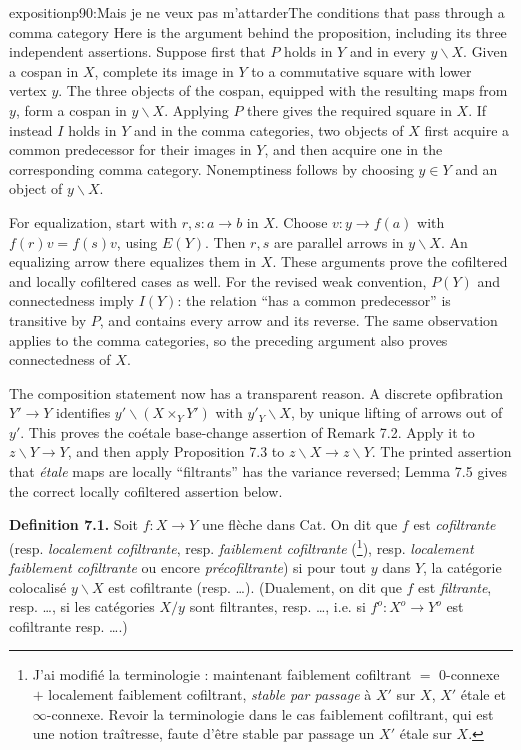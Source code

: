 \begin{dcomment}{exposition}{p90:Mais je ne veux pas m'attarder}{The conditions that pass through a comma category}
Here is the argument behind the proposition, including its three independent assertions. Suppose first that $P$ holds in $Y$ and in every $y\backslash X$. Given a cospan in $X$, complete its image in $Y$ to a commutative square with lower vertex $y$. The three objects of the cospan, equipped with the resulting maps from $y$, form a cospan in $y\backslash X$. Applying $P$ there gives the required square in $X$. If instead $I$ holds in $Y$ and in the comma categories, two objects of $X$ first acquire a common predecessor for their images in $Y$, and then acquire one in the corresponding comma category. Nonemptiness follows by choosing $y\in Y$ and an object of $y\backslash X$.

For equalization, start with $r,s:a\to b$ in $X$. Choose $v:y\to f(a)$ with $f(r)v=f(s)v$, using $E(Y)$. Then $r,s$ are parallel arrows in $y\backslash X$. An equalizing arrow there equalizes them in $X$. These arguments prove the cofiltered and locally cofiltered cases as well. For the revised weak convention, $P(Y)$ and connectedness imply $I(Y)$: the relation ``has a common predecessor'' is transitive by $P$, and contains every arrow and its reverse. The same observation applies to the comma categories, so the preceding argument also proves connectedness of $X$.

The composition statement now has a transparent reason. A discrete opfibration $Y'\to Y$ identifies $y'\backslash(X\times_Y Y')$ with $y'_{Y}\backslash X$, by unique lifting of arrows out of $y'$. This proves the co\'etale base-change assertion of Remark 7.2. Apply it to $z\backslash Y\to Y$, and then apply Proposition 7.3 to $z\backslash X\to z\backslash Y$. The printed assertion that \emph{\'etale} maps are locally ``filtrants'' has the variance reversed; Lemma 7.5 gives the correct locally cofiltered assertion below.
\end{dcomment}


\textbf{Definition 7.1.} Soit $f : X \longrightarrow Y$ une flèche dans Cat. On dit que $f$ est \textit{cofiltrante} (resp. \textit{localement cofiltrante}, resp. \textit{faiblement cofiltrante} (\footnote[64]{J'ai modifié la terminologie : maintenant faiblement cofiltrant $=$ 0-connexe $+$ localement faiblement cofiltrant, \textit{stable par passage} à $X'$ sur $X$, $X'$ étale et $\infty$-connexe. Revoir la terminologie dans le cas faiblement cofiltrant, qui est une notion traîtresse, faute d'être stable par passage un $X'$ étale sur $X$.}), resp. \textit{localement faiblement cofiltrante} ou encore \textit{précofiltrante}) si pour tout $y$ dans $Y$, la catégorie colocalisé $y\backslash X$ est cofiltrante (resp. \dots). (Dualement, on dit que $f$ est \textit{filtrante}, resp. \dots, si les catégories $X/y$ sont filtrantes, resp. \dots, i.e. si $f^o : X^o \longrightarrow Y^o$ est cofiltrante resp. \dots.) %

